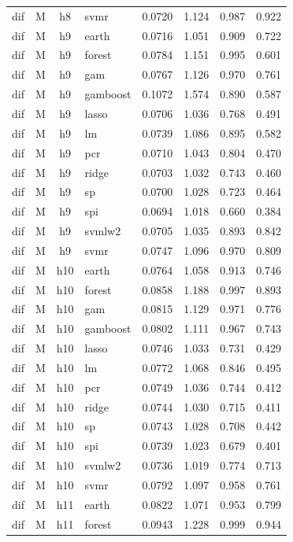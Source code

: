 \begin{ThreePartTable}
\begin{longtable}[t]{llclcccc}
dif & M & h8 & svmr & 0.0720 & 1.124 & 0.987 & 0.922\\
\addlinespace
dif & M & h9 & earth & 0.0716 & 1.051 & 0.909 & 0.722\\
dif & M & h9 & forest & 0.0784 & 1.151 & 0.995 & 0.601\\
dif & M & h9 & gam & 0.0767 & 1.126 & 0.970 & 0.761\\
dif & M & h9 & gamboost & 0.1072 & 1.574 & 0.890 & 0.587\\
dif & M & h9 & lasso & 0.0706 & 1.036 & 0.768 & 0.491\\
dif & M & h9 & lm & 0.0739 & 1.086 & 0.895 & 0.582\\
dif & M & h9 & pcr & 0.0710 & 1.043 & 0.804 & 0.470\\
dif & M & h9 & ridge & 0.0703 & 1.032 & 0.743 & 0.460\\
dif & M & h9 & sp & 0.0700 & 1.028 & 0.723 & 0.464\\
dif & M & h9 & spi & 0.0694 & 1.018 & 0.660 & 0.384\\
dif & M & h9 & svmlw2 & 0.0705 & 1.035 & 0.893 & 0.842\\
dif & M & h9 & svmr & 0.0747 & 1.096 & 0.970 & 0.809\\
\addlinespace
dif & M & h10 & earth & 0.0764 & 1.058 & 0.913 & 0.746\\
dif & M & h10 & forest & 0.0858 & 1.188 & 0.997 & 0.893\\
dif & M & h10 & gam & 0.0815 & 1.129 & 0.971 & 0.776\\
dif & M & h10 & gamboost & 0.0802 & 1.111 & 0.967 & 0.743\\
dif & M & h10 & lasso & 0.0746 & 1.033 & 0.731 & 0.429\\
dif & M & h10 & lm & 0.0772 & 1.068 & 0.846 & 0.495\\
dif & M & h10 & pcr & 0.0749 & 1.036 & 0.744 & 0.412\\
dif & M & h10 & ridge & 0.0744 & 1.030 & 0.715 & 0.411\\
dif & M & h10 & sp & 0.0743 & 1.028 & 0.708 & 0.442\\
dif & M & h10 & spi & 0.0739 & 1.023 & 0.679 & 0.401\\
dif & M & h10 & svmlw2 & 0.0736 & 1.019 & 0.774 & 0.713\\
dif & M & h10 & svmr & 0.0792 & 1.097 & 0.958 & 0.761\\
\addlinespace
dif & M & h11 & earth & 0.0822 & 1.071 & 0.953 & 0.799\\
dif & M & h11 & forest & 0.0943 & 1.228 & 0.999 & 0.944\\

\end{longtable}
\end{ThreePartTable}
